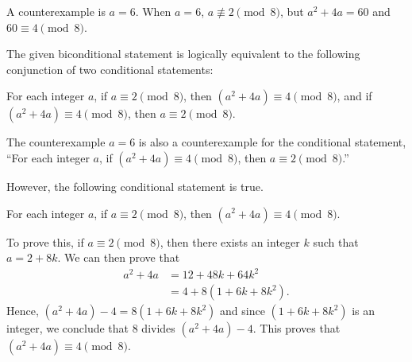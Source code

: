 \documentclass[11pt]{article}
\begin{document}
\begin{enumerate}
A counterexample is $a = 6$.  When $a = 6$, $a \not \equiv 2 \pmod 8$, but $a^2 + 4a = 60$ and 
$60 \equiv 4 \pmod 8$.

The given biconditional statement is logically equivalent to the following conjunction of two conditional statements:
\begin{list}{}
\item For each integer $a$, if $a \equiv 2 \pmod 8$, then $(a^2 + 4a) \equiv 4 \pmod 8$, and if $(a^2 + 4a) \equiv 4 \pmod 8$, then $a \equiv 2 \pmod 8$.
\end{list}
The counterexample $a = 6$ is also a counterexample for the conditional statement, ``For each integer $a$, if 
$(a^2 + 4a) \equiv 4 \pmod 8$, then $a \equiv 2 \pmod 8$.''


\newpar
However, the following conditional statement is true.
\begin{list}{}
\item For each integer $a$, if $a \equiv 2 \pmod 8$, then $(a^2 + 4a) \equiv 4 \pmod 8$.  
\end{list}
To prove this, if $a \equiv 2 \pmod 8$, then there exists an integer $k$ such that $a = 2 + 8k$.  We can then prove that
\begin{align*}
a^2 + 4a &= 12 + 48k + 64k^2\\
         & = 4 + 8(1 + 6k + 8k^2).
\end{align*}
Hence, $\left( a^2 + 4a \right) - 4 = 8 \left( 1 + 6k + 8k^2 \right)$ and since 
$\left( 1 + 6k + 8k^2 \right)$ is an integer, we conclude that 8 divides $\left( a^2 + 4a \right) - 4$.  This proves that $(a^2 + 4a) \equiv 4 \pmod 8$.
\end{enumerate}
\end{document}
